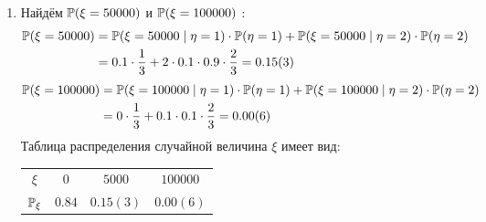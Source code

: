 \begin{enumerate}
\begin{enumerate}
\item Найдём $\P (\xi = 50000 )$ и $\P (\xi = 100000 )$ :
\begin{align*}
\P (\xi = 50000 ) &= \P (\xi = 50000 \mid \eta = 1 ) \cdot \P ( \eta = 1  ) +  \P (\xi = 50000 \mid \eta = 2 ) \cdot  \P ( \eta = 2 ) \\
&= 0.1 \cdot \frac{1}{3} + 2 \cdot 0.1 \cdot 0.9 \cdot \frac{2}{3} = 0.15(3)
\end{align*}
\begin{align*}
\P (\xi = 100000 ) &=  \P (\xi = 100000 \mid \eta = 1 ) \cdot \P ( \eta = 1 ) +  \P (\xi = 100000 \mid \eta = 2 ) \cdot  \P ( \eta = 2  ) \\
&= 0 \cdot \frac{1}{3} + 0.1\cdot 0.1  \cdot \frac{2}{3} = 0.00(6)
\end{align*}
Таблица распределения случайной величина $\xi$ имеет вид:

\begin{center}
\begin{tabular}{cccc}
\toprule
$\xi$ & $ 0 $ & $5000$ & $100000$ \\
$\P_{\xi}$ & $0.84$ & $0.15(3)$ & $0.00(6)$ \\ \bottomrule
\end{tabular}
\end{center}


\end{enumerate}
\end{enumerate}
